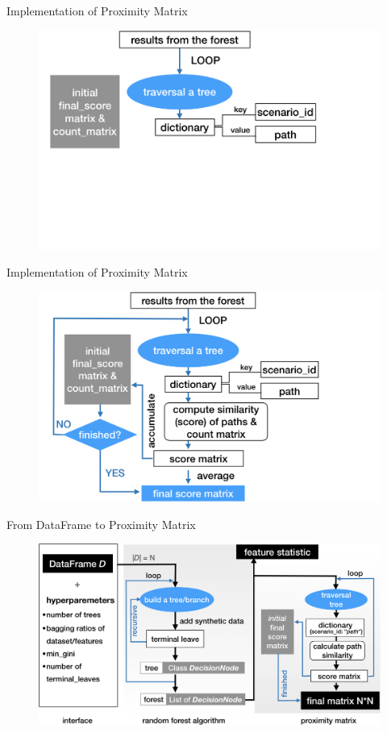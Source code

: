\documentclass[shortpres]{beamer}
\begin{document}
    \begin{frame}{Implementation of Proximity Matrix}	
      \begin{figure}
        \includegraphics[height=0.8\textheight]{fig/proximity0.png}
      \end{figure}
    \end{frame}
   
    \begin{frame}{Implementation of Proximity Matrix}	
      \begin{figure}
        \includegraphics[height=0.8\textheight]{fig/proximity.png}
      \end{figure}
      \end{frame}
      \begin{frame}{From DataFrame to Proximity Matrix}	
        \begin{figure}
          \includegraphics[height=0.74\textheight]{fig/dandp3.png}
        \end{figure}
        \end{frame}
\end{document}
